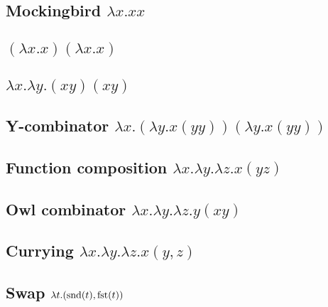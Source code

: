 %

\subsection{Mockingbird $\lambda x . x x$} %
\subsection{$(\lambda x . x)(\lambda x . x)$} %
\subsection{$\lambda x . \lambda y . (xy)(xy)$} %
\subsection{Y-combinator $\lambda x . (\lambda y . x (y y)) (\lambda y . x (y y))$} %
\subsection{Function composition $\lambda x . \lambda y . \lambda z . x ( y z)$} %
\subsection{Owl combinator $\lambda x . \lambda y . \lambda z . y (x y)$} %
\subsection{Currying $\lambda x . \lambda y . \lambda z . x (y, z)$} %
\subsection{Swap $\lambda t . (\mathrm{snd}(t), \mathrm{fst}(t))$}






